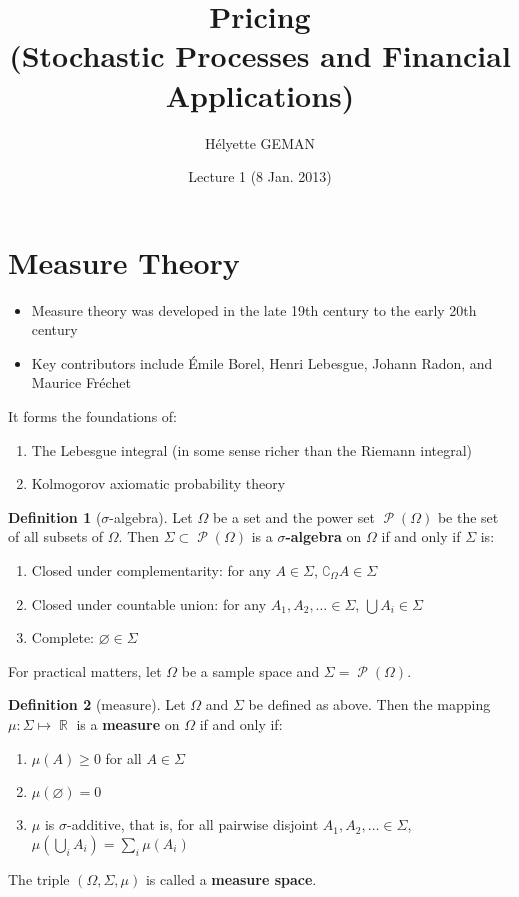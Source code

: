 \documentclass[11pt]{article}
\title{\textbf{Pricing}\\(Stochastic Processes and Financial Applications)}
\author{Hélyette GEMAN}
\date{Lecture 1 (8 Jan. 2013)}
\theoremstyle{definition}
\newtheorem{definition}{Definition}[section]
\theoremstyle{remark}
\DeclareMathOperator{\Real}{\mathbb{R}}
\DeclareMathOperator{\Pow}{\mathcal{P}}
\begin{document}
{\small \maketitle}

\section{Measure Theory}

\begin{itemize}
\item Measure theory was developed in the late 19th century to the early 20th century
\item Key contributors include Émile Borel, Henri Lebesgue, Johann Radon, and Maurice Fréchet
\end{itemize}

It forms the foundations of:

\begin{enumerate}
\item The Lebesgue integral (in some sense richer than the Riemann integral)
\item Kolmogorov axiomatic probability theory
\end{enumerate}

\begin{definition}[$\sigma$-algebra] 
Let $\Omega$ be a set and the power set $\Pow(\Omega)$ be the set of all subsets of $\Omega$. Then $\Sigma \subset \Pow(\Omega)$ is a {\bf $\sigma$-algebra} on $\Omega$ if and only if $\Sigma$ is:
\begin{enumerate}
\item Closed under complementarity: for any $A \in \Sigma$, $\complement_\Omega A \in \Sigma$
\item Closed under countable union: for any $A_1, A_2, \dots \in \Sigma$, $\bigcup A_i \in \Sigma$
\item Complete: $\varnothing \in \Sigma$
\end{enumerate}
\end{definition}
For practical matters, let $\Omega$ be a sample space and $\Sigma = \Pow(\Omega)$.

\begin{definition}[measure]
Let $\Omega$ and $\Sigma$ be defined as above. Then the mapping $\mu:\Sigma\mapsto \Real$ is a {\bf measure} on $\Omega$ if and only if:
\begin{enumerate}
\item $\mu(A) \geq 0$ for all $A \in \Sigma$
\item $\mu(\varnothing) = 0$
\item $\mu$ is $\sigma$-additive, that is, for all pairwise disjoint $A_1, A_2, \dots \in \Sigma$, $\mu\left(\bigcup_i A_i\right) = \sum_i \mu(A_i)$
\end{enumerate}
The triple $(\Omega, \Sigma, \mu)$ is called a {\bf measure space}.
\end{definition}
\end{document}

